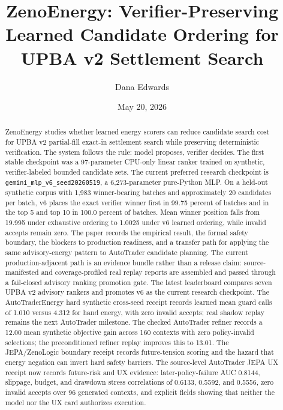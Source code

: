 \documentclass[11pt]{article}
\title{\textbf{ZenoEnergy: Verifier-Preserving Learned Candidate Ordering for UPBA v2 Settlement Search}}
\author{Dana Edwards}
\date{May 20, 2026}
\begin{document}
\maketitle

\begin{abstract}
ZenoEnergy studies whether learned energy scorers can reduce candidate search
cost for UPBA v2 partial-fill exact-in settlement search while preserving
deterministic verification. The system follows the rule: model proposes,
verifier decides. The first stable checkpoint was a 97-parameter CPU-only
linear ranker trained on synthetic, verifier-labeled bounded candidate sets.
The current preferred research checkpoint is
\texttt{gemini\_mlp\_v6\_seed20260519}, a 6,273-parameter pure-Python MLP. On a
held-out synthetic corpus with 1,983 winner-bearing batches and approximately
20 candidates per batch, v6 places the exact verifier winner first in 99.75
percent of batches and in the top 5 and top 10 in 100.0 percent of batches.
Mean winner position falls from 19.995 under exhaustive ordering to 1.0025
under v6 learned ordering, while invalid accepts remain zero. The paper records
the empirical result, the formal safety boundary, the blockers to production
readiness, and a transfer path for applying the same advisory-energy pattern to
AutoTrader candidate planning. The current production-adjacent path is an
evidence bundle rather than a release claim: source-manifested and
coverage-profiled real replay reports are assembled and passed through a
fail-closed advisory ranking promotion gate. The latest leaderboard compares
seven UPBA v2 advisory rankers and promotes v6 as the current research
checkpoint. The AutoTraderEnergy hard synthetic cross-seed receipt records
learned mean guard calls of 1.010 versus 4.312 for hand energy, with zero
invalid accepts; real shadow replay remains the next AutoTrader milestone.
The checked AutoTrader refiner records a 12.00 mean synthetic objective gain
across 160 contexts with zero policy-invalid selections; the preconditioned
refiner replay improves this to 13.01. The JEPA/ZenoLogic boundary receipt
records future-tension scoring and the hazard that energy negation can invert
hard safety barriers. The source-level AutoTrader JEPA UX receipt now records
future-risk and UX evidence: later-policy-failure AUC 0.8144, slippage, budget,
and drawdown stress correlations of 0.6133, 0.5592, and 0.5556, zero invalid
accepts over 96 generated contexts, and explicit fields showing that neither
the model nor the UX card authorizes execution.
\end{abstract}
\end{document}
